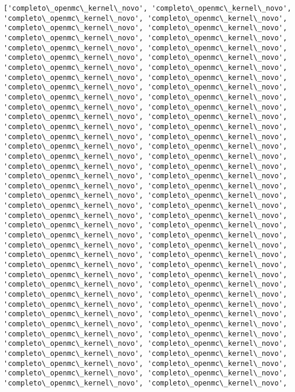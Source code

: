 \documentclass[11pt]{article}
\begin{document}
\begin{Verbatim}[commandchars=\\\{\}]
['completo\_openmc\_kernel\_novo', 'completo\_openmc\_kernel\_novo',
'completo\_openmc\_kernel\_novo', 'completo\_openmc\_kernel\_novo',
'completo\_openmc\_kernel\_novo', 'completo\_openmc\_kernel\_novo',
'completo\_openmc\_kernel\_novo', 'completo\_openmc\_kernel\_novo',
'completo\_openmc\_kernel\_novo', 'completo\_openmc\_kernel\_novo',
'completo\_openmc\_kernel\_novo', 'completo\_openmc\_kernel\_novo',
'completo\_openmc\_kernel\_novo', 'completo\_openmc\_kernel\_novo',
'completo\_openmc\_kernel\_novo', 'completo\_openmc\_kernel\_novo',
'completo\_openmc\_kernel\_novo', 'completo\_openmc\_kernel\_novo',
'completo\_openmc\_kernel\_novo', 'completo\_openmc\_kernel\_novo',
'completo\_openmc\_kernel\_novo', 'completo\_openmc\_kernel\_novo',
'completo\_openmc\_kernel\_novo', 'completo\_openmc\_kernel\_novo',
'completo\_openmc\_kernel\_novo', 'completo\_openmc\_kernel\_novo',
'completo\_openmc\_kernel\_novo', 'completo\_openmc\_kernel\_novo',
'completo\_openmc\_kernel\_novo', 'completo\_openmc\_kernel\_novo',
'completo\_openmc\_kernel\_novo', 'completo\_openmc\_kernel\_novo',
'completo\_openmc\_kernel\_novo', 'completo\_openmc\_kernel\_novo',
'completo\_openmc\_kernel\_novo', 'completo\_openmc\_kernel\_novo',
'completo\_openmc\_kernel\_novo', 'completo\_openmc\_kernel\_novo',
'completo\_openmc\_kernel\_novo', 'completo\_openmc\_kernel\_novo',
'completo\_openmc\_kernel\_novo', 'completo\_openmc\_kernel\_novo',
'completo\_openmc\_kernel\_novo', 'completo\_openmc\_kernel\_novo',
'completo\_openmc\_kernel\_novo', 'completo\_openmc\_kernel\_novo',
'completo\_openmc\_kernel\_novo', 'completo\_openmc\_kernel\_novo',
'completo\_openmc\_kernel\_novo', 'completo\_openmc\_kernel\_novo',
'completo\_openmc\_kernel\_novo', 'completo\_openmc\_kernel\_novo',
'completo\_openmc\_kernel\_novo', 'completo\_openmc\_kernel\_novo',
'completo\_openmc\_kernel\_novo', 'completo\_openmc\_kernel\_novo',
'completo\_openmc\_kernel\_novo', 'completo\_openmc\_kernel\_novo',
'completo\_openmc\_kernel\_novo', 'completo\_openmc\_kernel\_novo',
'completo\_openmc\_kernel\_novo', 'completo\_openmc\_kernel\_novo',
'completo\_openmc\_kernel\_novo', 'completo\_openmc\_kernel\_novo',
'completo\_openmc\_kernel\_novo', 'completo\_openmc\_kernel\_novo',
'completo\_openmc\_kernel\_novo', 'completo\_openmc\_kernel\_novo',
'completo\_openmc\_kernel\_novo', 'completo\_openmc\_kernel\_novo',
'completo\_openmc\_kernel\_novo', 'completo\_openmc\_kernel\_novo',
'completo\_openmc\_kernel\_novo', 'completo\_openmc\_kernel\_novo',
'completo\_openmc\_kernel\_novo', 'completo\_openmc\_kernel\_novo',
'completo\_openmc\_kernel\_novo', 'completo\_openmc\_kernel\_novo',

\end{Verbatim}
\end{document}
